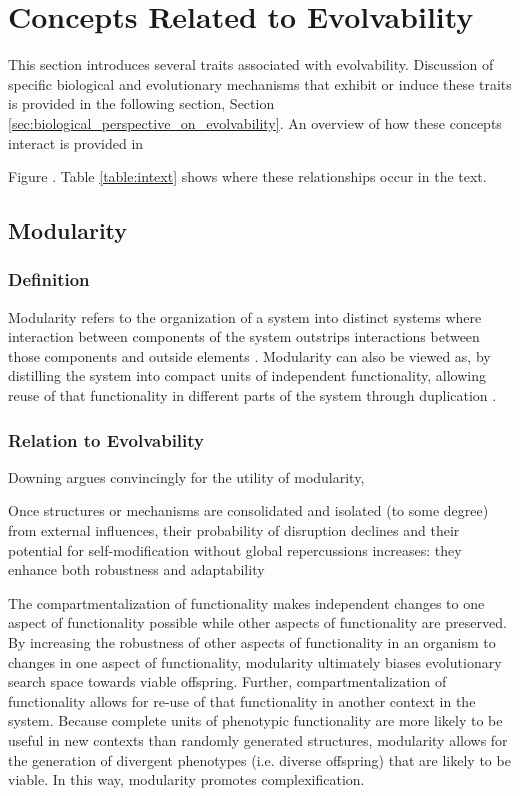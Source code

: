 \chapter{Concepts Related to Evolvability} \label{sec:concepts_related_to_evolvability}
This section introduces several traits associated with evolvability. Discussion of specific biological and evolutionary mechanisms that exhibit or induce these traits is provided in the following section, Section \ref{sec:biological_perspective_on_evolvability}. An overview of how these concepts interact is provided in 
\begin{samepage}
Figure . Table \ref{table:intext} shows where these relationships occur in the text.
\printindex[mindmap]{}
\end{samepage}

\section{Modularity} \label{sec:modularity}
\subsection{Definition}
Modularity refers to the organization of a system into distinct systems where interaction between components of the system outstrips interactions between those components and outside elements \cite[p 207]{Downing2015IntelligenceSystems}. Modularity can also be viewed as, by distilling the system into compact units of independent functionality, allowing reuse of that functionality in different parts of the system through duplication \cite{Reisinger2005TowardsEvolvability}.

\subsection{Relation to Evolvability}
Downing argues convincingly for the utility of modularity,
\begin{displayquote}
Once structures or mechanisms are consolidated and isolated (to some degree) from external influences, their probability of disruption declines and their potential for self-modification without global repercussions increases: they enhance both robustness and adaptability \cite[p 208]{Downing2015IntelligenceSystems}
\end{displayquote}
The compartmentalization of functionality makes independent changes to one aspect of functionality possible while other aspects of functionality are preserved. By increasing the robustness of other aspects of functionality in an organism to changes in one aspect of functionality, modularity ultimately biases evolutionary search space towards viable offspring. \mindmapmark{\robustnessmodularity} Further, compartmentalization of functionality allows for re-use of that functionality in another context in the system. Because complete units of phenotypic functionality are more likely to be useful in new contexts than randomly generated structures, modularity allows for the generation of divergent phenotypes (i.e. diverse offspring) that are likely to be viable. In this way, modularity promotes complexification.\mindmapmark{\complexificationmodularity}

